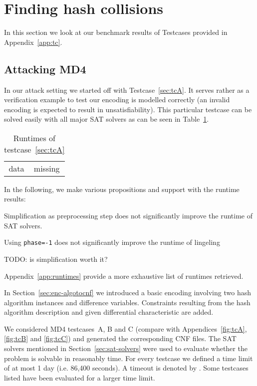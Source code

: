 \section{Finding hash collisions}
\label{sec:results-attacks}

In this section we look at our benchmark results of Testcases provided in
Appendix~\ref{app:tc}.

\subsection{Attacking MD4}
\label{sec:results-md4}
%
In our attack setting we started off with Testcase~\ref{sec:tcA}. It serves
rather as a verification example to test our encoding is modelled correctly
(an invalid encoding is expected to result in unsatisfiability). This particular
testcase can be solved easily with all major SAT solvers as can be seen in
Table~\ref{tab:tcA-results}.

\begin{table}[!h]
  \begin{center}
    \begin{tabular}{cc}
      data & missing
    \end{tabular}
    \caption{Runtimes of testcase~\ref{sec:tcA}}
    \label{tab:tcA-results}
  \end{center}
\end{table}

In the following, we make various propositions and support with the runtime results:

\begin{prop}
  Simplification as preprocessing step does not significantly improve the runtime of SAT solvers.
\end{prop}

\begin{prop}
  Using \texttt{\textendash{}\textendash{}phase=-1} does not significantly
  improve the runtime of lingeling
\end{prop}


TODO: is simplification worth it?

Appendix~\ref{app:runtimes} provide a more exhaustive list of runtimes retrieved.

In Section~\ref{sec:enc-algotocnf} we introduced a basic encoding involving two hash algorithm
instances and difference variables. Constraints resulting from the hash algorithm description
and given differential characteristic are added.

We considered MD4 testcases~A, B and C (compare with Appendices~\ref{fig:tcA}, \ref{fig:tcB} and \ref{fig:tcC})
and generated the corresponding CNF files. The SAT solvers mentioned in Section~\ref{sec:sat-solvers}
were used to evaluate whether the problem is solvable in reasonably time. For every testcase we
defined a time limit of at most 1 day (i.e. 86,400 seconds). A timeout is denoted by \timeout.
Some testcases listed have been evaluated for a larger time limit.

